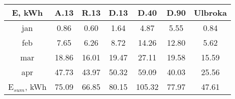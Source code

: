\begin{tabular}{ | c | c c c c c c | }\hline
E, kWh	&A.13	&R.13	&D.13	&D.40	&D.90 &Ulbroka\\ \hline
jan	&0.86	&0.60	&1.64	&4.87	&5.55	&0.84\\
feb	&7.65	&6.26	&8.72	&14.26	&12.80	&5.62\\
mar	&18.86	&16.01	&19.47	&27.11	&19.58	&15.59\\
apr	&47.73	&43.97	&50.32	&59.09	&40.03	&25.56\\ \hline
E$_{sum}$, kWh	&75.09	&66.85	&80.15	&105.32	&77.97	&47.61\\ \hline
\end{tabular}